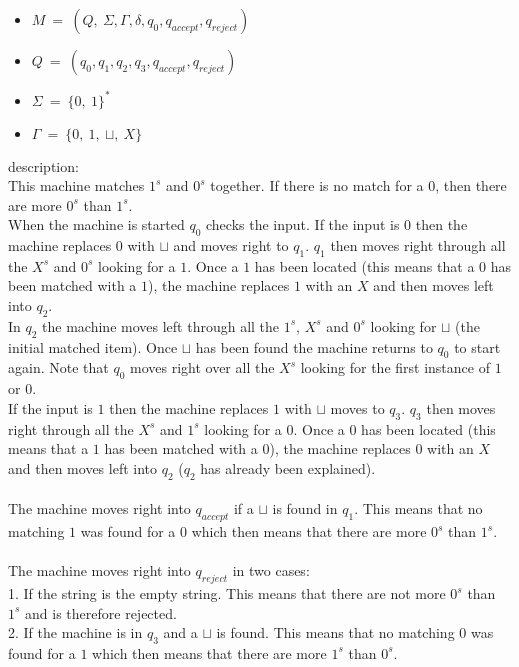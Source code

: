 \documentclass[a4paper,12pt]{article}
\begin{document}
\begin{itemize}
	\item $M \: = \: ( Q, \: \Sigma , \Gamma , \delta, q_0, q_{accept}, q_{reject} )$ 
	\item $Q \: = \: (q_0, q_1, q_2, q_3, q_{accept}, q_{reject} )$ 
	\item $\Sigma \: = \: \{0,\: 1 \}^*$ 
	\item $\Gamma \: = \: \{0,\: 1,\: \sqcup, \: X \}$ 
\end{itemize}
description: \\
This machine matches $1^s$ and $0^s$ together. If there is no match for a $0$, then there are more $0^s$ than $1^s$. \\ 
When the machine is started $q_0$ checks the input. If the input is $0$ then the machine replaces $0$ with $\sqcup$ and moves right to $q_1$. $q_1$ then moves right through all the $X^s$ and $0^s$ looking for a $1$. Once a $1$ has been located (this means that a $0$ has been matched with a $1$), the machine replaces $1$ with an $X$ and then moves left into $q_2$.  \\ 
In $q_2$ the machine moves left through all the $1^s$, $X^s$ and $0^s$ looking for $\sqcup$ (the initial matched item). Once $\sqcup$ has been found the machine returns to $q_0$ to start again. Note that $q_0$ moves right over all the $X^s$ looking for the first instance of $1$ or $0$. \\
If the input is $1$ then the machine replaces $1$ with $\sqcup$ moves to $q_3$. $q_3$ then moves right through all the $X^s$ and $1^s$ looking for a $0$. Once a $0$ has been located (this means that a $1$ has been matched with a $0$), the machine replaces $0$ with an $X$ and then moves left into $q_2$ ($q_2$ has already been explained). \\ 
\\
The machine moves right into $q_{accept}$ if a $\sqcup$ is found in $q_1$. This means that no matching $1$ was found for a $0$ which then means that there are more $0^s$ than $1^s$. \\
\\
The machine moves right into $q_{reject}$ in two cases: \\
1. If the string is the empty string. This means that there are not more $0^s$ than $1^s$ and is therefore rejected. \\
2. If the machine is in $q_3$ and a $\sqcup$ is found. This means that no matching $0$ was found for a $1$ which then means that there are more $1^s$ than $0^s$. \\
\end{document}
